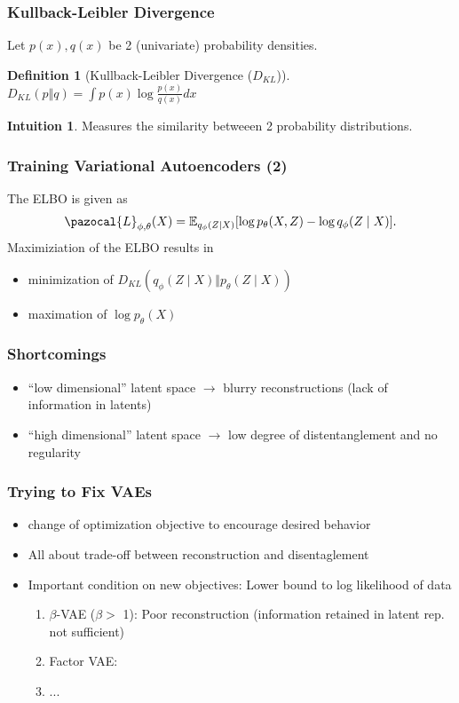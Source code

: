 \documentclass{beamer}
\newcommand{\Lb}{\pazocal{L}}
\newcommand{\E}{\mathbb{E}}
\theoremstyle{definition}
\newtheorem{definition}[section]{Definition}
\newtheorem{intuition}{Intuition}
\begin{document}
    \begin{frame}
      \frametitle{Kullback-Leibler Divergence}
      Let $p(x), q(x)$ be 2 (univariate) probability densities.
      \begin{definition}[Kullback-Leibler Divergence ($D_{KL}$)]
       $D_{KL}(p \Vert q)= \int p(x) \log \frac{p(x)}{q(x)} dx$
      \end{definition}
      \begin{intuition}
        Measures the similarity betweeen 2 probability distributions.
      \end{intuition}

    \end{frame}
    \begin{frame}
      \frametitle{Training Variational Autoencoders (2)}
      The ELBO is given as
      \begin{align*}
        \Lb_{\phi, \theta}(X) = \E_{q_{\phi}(Z \mid X)}[\log p_{\theta}(X, Z) - \log q_{\phi}(Z \mid X)].
      \end{align*}
      Maximiziation of the ELBO results in
      \begin{itemize}
        \item minimization of $D_{KL}(q_{\phi}(Z \mid X) \Vert p_{\theta}(Z \mid X))$
             \item maximation of $\log p_{\theta}(X)$
      \end{itemize}
    \end{frame}

    \begin{frame}
      \frametitle{Shortcomings}
      \begin{itemize}
        \item \enquote{low dimensional} latent space $\to$ blurry reconstructions (lack of information in latents)
        \item \enquote{high dimensional} latent space $\to$ low degree of distentanglement and no regularity
      \end{itemize}
    \end{frame}

    \begin{frame}
      \frametitle{Trying to Fix VAEs}
      \begin{itemize}
        \item change of optimization objective to encourage desired behavior
        \item All about trade-off between reconstruction and disentaglement
        \item Important condition on new objectives: Lower bound to log likelihood of data
        \begin{enumerate}
          \item $\beta$-VAE ($\beta > $ 1): Poor reconstruction (information retained in latent rep. not sufficient)
          \item Factor VAE:
          \item ...
        \end{enumerate}
      \end{itemize}
    \end{frame}
\end{document}
